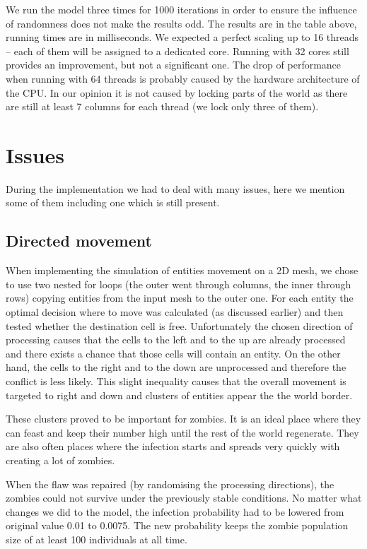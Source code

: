 \documentclass[a4paper]{article}
\begin{document}
We run the model three times for 1000 iterations in order to ensure the influence of randomness does not make the results odd.
The results are in the table above, running times are in milliseconds.
We expected a perfect scaling up to 16 threads -- each of them will be assigned to a dedicated core.
Running with 32 cores still provides an improvement, but not a significant one.
The drop of performance when running with 64 threads is probably caused by the hardware architecture of the CPU.
In our opinion it is not caused by locking parts of the world as there are still at least 7 columns for each thread (we lock only three of them).

\section{Issues}

During the implementation we had to deal with many issues, here we mention some of them including one which is still present.

\subsection{Directed movement}

When implementing the simulation of entities movement on a 2D mesh, we chose to use two nested for loops (the outer went through columns, the inner through rows) copying entities from the input mesh to the outer one.
For each entity the optimal decision where to move was calculated (as discussed earlier) and then tested whether the destination cell is free.
Unfortunately the chosen direction of processing causes that the cells to the left and to the up are already processed and there exists a chance that those cells will contain an entity.
On the other hand, the cells to the right and to the down are unprocessed and therefore the conflict is less likely.
This slight inequality causes that the overall movement is targeted to right and down and clusters of entities appear the the world border.

These clusters proved to be important for zombies.
It is an ideal place where they can feast and keep their number high until the rest of the world regenerate.
They are also often places where the infection starts and spreads very quickly with creating a lot of zombies.

When the flaw was repaired (by randomising the processing directions), the zombies could not survive under the previously stable conditions.
No matter what changes we did to the model, the infection probability had to be lowered from original value 0.01 to 0.0075.
The new probability keeps the zombie population size of at least 100 individuals at all time.
\end{document}
